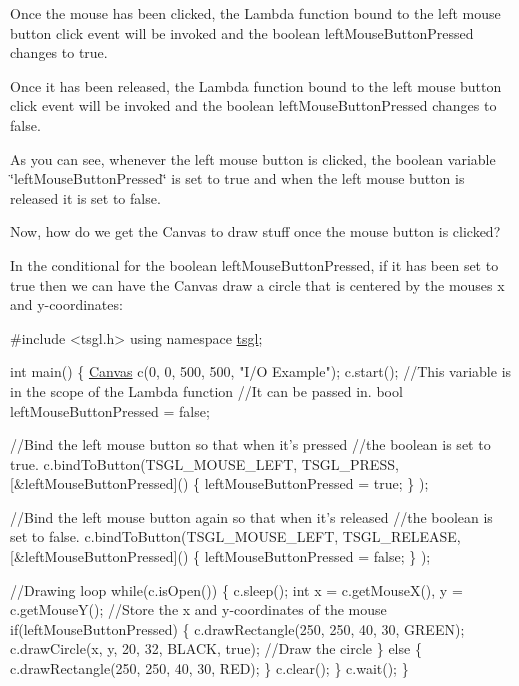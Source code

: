 \begin{DoxyItemize}
\item Once the mouse has been clicked, the Lambda function bound to the left mouse button click event will be invoked and the boolean {\ttfamily left\+Mouse\+Button\+Pressed} changes to true.
\item Once it has been released, the Lambda function bound to the left mouse button click event will be invoked and the boolean {\ttfamily left\+Mouse\+Button\+Pressed} changes to false.
\end{DoxyItemize}

As you can see, whenever the left mouse button is clicked, the boolean variable \char`\"{}left\+Mouse\+Button\+Pressed\char`\"{} is set to true and when the left mouse button is released it is set to false.

Now, how do we get the Canvas to draw stuff once the mouse button is clicked?

In the conditional for the boolean {\ttfamily left\+Mouse\+Button\+Pressed}, if it has been set to {\ttfamily true} then we can have the Canvas draw a circle that is centered by the mouse\textquotesingle{}s x and y-\/coordinates\+:


\begin{DoxyCode}
\textcolor{preprocessor}{#include <tsgl.h>}
\textcolor{keyword}{using namespace }\hyperlink{namespacetsgl}{tsgl};

\textcolor{keywordtype}{int} main() \{
  \hyperlink{classtsgl_1_1_canvas}{Canvas} c(0, 0, 500, 500, \textcolor{stringliteral}{"I/O Example"});
  c.start();
  \textcolor{comment}{//This variable is in the scope of the Lambda function }
  \textcolor{comment}{//It can be passed in.}
  \textcolor{keywordtype}{bool} leftMouseButtonPressed = \textcolor{keyword}{false};

  \textcolor{comment}{//Bind the left mouse button so that when it's pressed}
  \textcolor{comment}{//the boolean is set to true.}
  c.bindToButton(TSGL\_MOUSE\_LEFT, TSGL\_PRESS, 
                    [&leftMouseButtonPressed]() \{
                          leftMouseButtonPressed = \textcolor{keyword}{true};
                    \}
                );

  \textcolor{comment}{//Bind the left mouse button again so that when it's released }
  \textcolor{comment}{//the boolean is set to false.}
  c.bindToButton(TSGL\_MOUSE\_LEFT, TSGL\_RELEASE, 
                    [&leftMouseButtonPressed]() \{
                          leftMouseButtonPressed = \textcolor{keyword}{false};
                    \}
                );

  \textcolor{comment}{//Drawing loop}
  \textcolor{keywordflow}{while}(c.isOpen()) \{
    c.sleep();
    \textcolor{keywordtype}{int} x = c.getMouseX(), y = c.getMouseY();  \textcolor{comment}{//Store the x and y-coordinates of the mouse}
    \textcolor{keywordflow}{if}(leftMouseButtonPressed) \{
      c.drawRectangle(250, 250, 40, 30, GREEN);
      c.drawCircle(x, y, 20, 32, BLACK, \textcolor{keyword}{true});  \textcolor{comment}{//Draw the circle}
    \} \textcolor{keywordflow}{else} \{
      c.drawRectangle(250, 250, 40, 30, RED);
    \}
    c.clear();
  \}
  c.wait();
\}
\end{DoxyCode}


